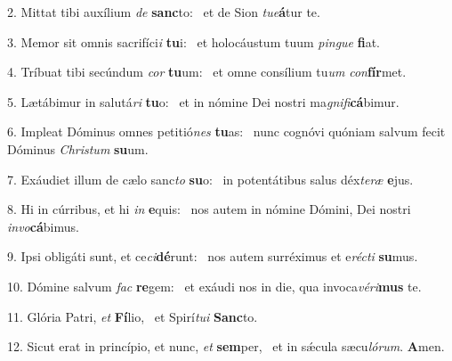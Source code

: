2. Mittat tibi auxílium \textit{de} \textbf{sanc}to: \ast\  et de Sion \textit{tu}\textit{e}\textbf{á}tur te.\

3. Memor sit omnis sacrifíci\textit{i} \textbf{tu}i: \ast\  et holocáustum tuum \textit{pin}\textit{gue} \textbf{fi}at.\

4. Tríbuat tibi secúndum \textit{cor} \textbf{tu}um: \ast\  et omne consílium tu\textit{um} \textit{con}\textbf{fír}met.\

5. Lætábimur in salutá\textit{ri} \textbf{tu}o: \ast\  et in nómine Dei nostri ma\textit{gni}\textit{fi}\textbf{cá}bimur.\

6. Impleat Dóminus omnes petitió\textit{nes} \textbf{tu}as: \ast\  nunc cognóvi quóniam salvum fecit Dóminus \textit{Chris}\textit{tum} \textbf{su}um.\

7. Exáudiet illum de cælo sanc\textit{to} \textbf{su}o: \ast\  in potentátibus salus déx\textit{te}\textit{ræ} \textbf{e}jus.\

8. Hi in cúrribus, et hi \textit{in} \textbf{e}quis: \ast\  nos autem in nómine Dómini, Dei nostri \textit{in}\textit{vo}\textbf{cá}bimus.\

9. Ipsi obligáti sunt, et ce\textit{ci}\textbf{dé}runt: \ast\  nos autem surréximus et e\textit{réc}\textit{ti} \textbf{su}mus.\

10. Dómine salvum \textit{fac} \textbf{re}gem: \ast\  et exáudi nos in die, qua invoca\textit{vé}\textit{ri}\textbf{mus} te.\

11. Glória Patri, \textit{et} \textbf{Fí}lio, \ast\  et Spirí\textit{tu}\textit{i} \textbf{Sanc}to.\

12. Sicut erat in princípio, et nunc, \textit{et} \textbf{sem}per, \ast\  et in sǽcula sæcu\textit{ló}\textit{rum}. \textbf{A}men.\

